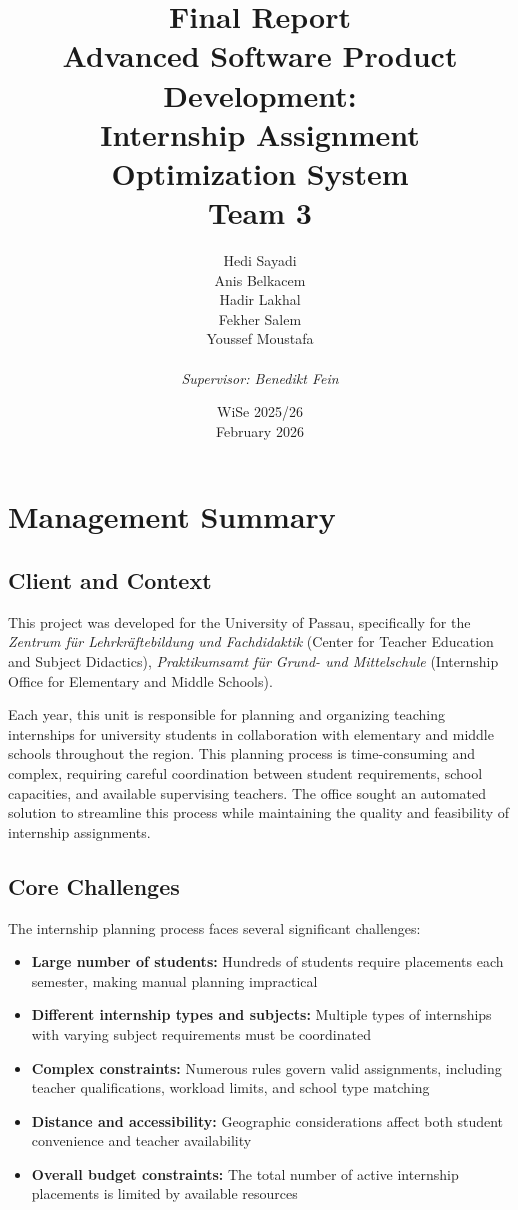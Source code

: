 \documentclass[12pt,a4paper]{report}
\title{
    \vspace{2cm}
    {\Huge \textbf{Final Report}} \\
    \vspace{1.5cm}
    {\Large Advanced Software Product Development:} \\
    \vspace{0.3cm}
    {\Large Internship Assignment Optimization System} \\
    \vspace{2cm}
    {\large Team 3}
}
\author{
    Hedi Sayadi \\
    Anis Belkacem \\
    Hadir Lakhal \\
    Fekher Salem \\
    Youssef Moustafa \\
    \vspace{1cm}
    \\
    \textit{Supervisor: Benedikt Fein}
}
\date{
    \vspace{1cm}
    WiSe 2025/26 \\ 
    \vspace{0.2cm}
    February 2026
}
\begin{document}
\maketitle

\chapter*{Management Summary}

\section*{Client and Context}
This project was developed for the University of Passau, specifically for the \textit{Zentrum für Lehrkräftebildung und Fachdidaktik} (Center for Teacher Education and Subject Didactics), \textit{Praktikumsamt für Grund- und Mittelschule} (Internship Office for Elementary and Middle Schools).

Each year, this unit is responsible for planning and organizing teaching internships for university students in collaboration with elementary and middle schools throughout the region. This planning process is time-consuming and complex, requiring careful coordination between student requirements, school capacities, and available supervising teachers. The office sought an automated solution to streamline this process while maintaining the quality and feasibility of internship assignments.

\section*{Core Challenges}
The internship planning process faces several significant challenges:
\begin{itemize}
    \item \textbf{Large number of students:} Hundreds of students require placements each semester, making manual planning impractical
    \item \textbf{Different internship types and subjects:} Multiple types of internships with varying subject requirements must be coordinated
    \item \textbf{Complex constraints:} Numerous rules govern valid assignments, including teacher qualifications, workload limits, and school type matching
    \item \textbf{Distance and accessibility:} Geographic considerations affect both student convenience and teacher availability
    \item \textbf{Overall budget constraints:} The total number of active internship placements is limited by available resources
\end{itemize}
\end{document}
